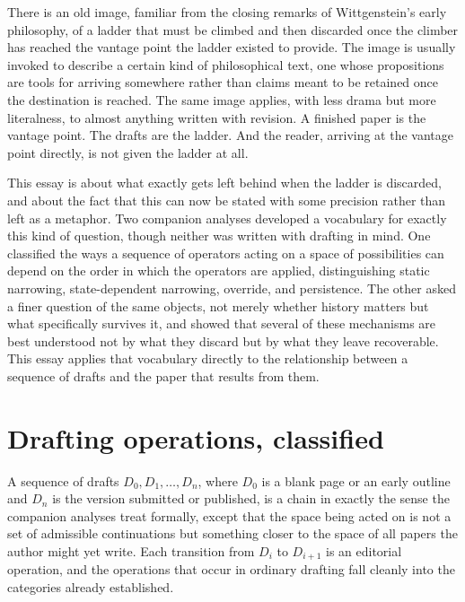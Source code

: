 \documentclass[11pt]{article}
\begin{document}
There is an old image, familiar from the closing remarks of Wittgenstein's early philosophy, of a ladder that must be climbed and then discarded once the climber has reached the vantage point the ladder existed to provide. The image is usually invoked to describe a certain kind of philosophical text, one whose propositions are tools for arriving somewhere rather than claims meant to be retained once the destination is reached. The same image applies, with less drama but more literalness, to almost anything written with revision. A finished paper is the vantage point. The drafts are the ladder. And the reader, arriving at the vantage point directly, is not given the ladder at all.

This essay is about what exactly gets left behind when the ladder is discarded, and about the fact that this can now be stated with some precision rather than left as a metaphor. Two companion analyses developed a vocabulary for exactly this kind of question, though neither was written with drafting in mind. One classified the ways a sequence of operators acting on a space of possibilities can depend on the order in which the operators are applied, distinguishing static narrowing, state-dependent narrowing, override, and persistence. The other asked a finer question of the same objects, not merely whether history matters but what specifically survives it, and showed that several of these mechanisms are best understood not by what they discard but by what they leave recoverable. This essay applies that vocabulary directly to the relationship between a sequence of drafts and the paper that results from them.

\section{Drafting operations, classified}

A sequence of drafts $D_0, D_1, \ldots, D_n$, where $D_0$ is a blank page or an early outline and $D_n$ is the version submitted or published, is a chain in exactly the sense the companion analyses treat formally, except that the space being acted on is not a set of admissible continuations but something closer to the space of all papers the author might yet write. Each transition from $D_i$ to $D_{i+1}$ is an editorial operation, and the operations that occur in ordinary drafting fall cleanly into the categories already established.
\end{document}
